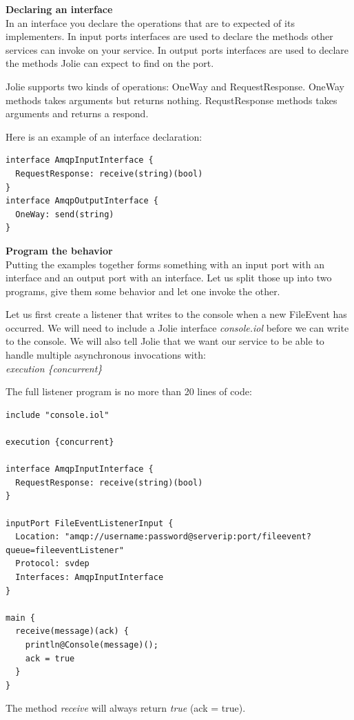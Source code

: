 \noindent\textbf{Declaring an interface}\\
In an interface you declare the operations that are to expected of its implementers. In input ports interfaces are used to declare the methods other services can invoke on your service. In output ports interfaces are used to declare the methods Jolie can expect to find on the port.

Jolie supports two kinds of operations: OneWay and RequestResponse. OneWay methods takes arguments but returns nothing. RequstResponse methods takes arguments and returns a respond.

Here is an example of an interface declaration:

\begin{lstlisting}
interface AmqpInputInterface {
  RequestResponse: receive(string)(bool)
}
interface AmqpOutputInterface {
  OneWay: send(string)
}
\end{lstlisting}

\noindent\textbf{Program the behavior}\\
Putting the examples together forms something with an input port with an interface and an output port with an interface. Let us split those up into two programs, give them some behavior and let one invoke the other.

Let us first create a listener that writes to the console when a new FileEvent has occurred. We will need to include a Jolie interface \textit{console.iol} before we can write to the console. We will also tell Jolie that we want our service to be able to handle multiple asynchronous invocations with:\\
\indent\textit{execution \{concurrent\}}

The full listener program is no more than 20 lines of code:

\begin{lstlisting}
include "console.iol"

execution {concurrent}

interface AmqpInputInterface {
  RequestResponse: receive(string)(bool)
}

inputPort FileEventListenerInput {
  Location: "amqp://username:password@serverip:port/fileevent?queue=fileeventListener"
  Protocol: svdep
  Interfaces: AmqpInputInterface
}

main {
  receive(message)(ack) {
    println@Console(message)();
    ack = true
  }
}
\end{lstlisting}

The method \textit{receive} will always return \textit{true} (ack = true).

